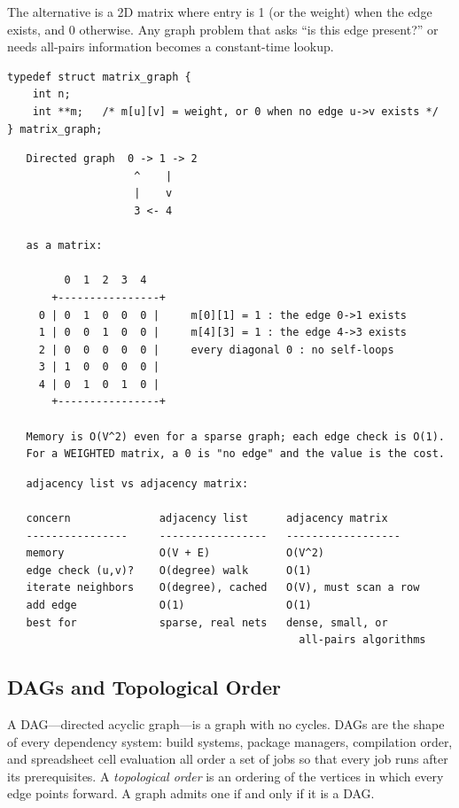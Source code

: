 The alternative is a 2D matrix where entry  is 1 (or the
weight) when the edge  exists, and 0 otherwise. Any graph
problem that asks ``is this edge present?'' or needs all-pairs
information becomes a constant-time lookup.

\begin{lstlisting}[caption={Adjacency matrix representation.}]
typedef struct matrix_graph {
    int n;
    int **m;   /* m[u][v] = weight, or 0 when no edge u->v exists */
} matrix_graph;
\end{lstlisting}

\begin{verbatim}
   Directed graph  0 -> 1 -> 2
                    ^    |
                    |    v
                    3 <- 4

   as a matrix:

         0  1  2  3  4
       +----------------+
     0 | 0  1  0  0  0 |     m[0][1] = 1 : the edge 0->1 exists
     1 | 0  0  1  0  0 |     m[4][3] = 1 : the edge 4->3 exists
     2 | 0  0  0  0  0 |     every diagonal 0 : no self-loops
     3 | 1  0  0  0  0 |
     4 | 0  1  0  1  0 |
       +----------------+

   Memory is O(V^2) even for a sparse graph; each edge check is O(1).
   For a WEIGHTED matrix, a 0 is "no edge" and the value is the cost.
\end{verbatim}

\begin{verbatim}
   adjacency list vs adjacency matrix:

   concern              adjacency list      adjacency matrix
   ----------------     -----------------   ------------------
   memory               O(V + E)            O(V^2)
   edge check (u,v)?    O(degree) walk      O(1)
   iterate neighbors    O(degree), cached   O(V), must scan a row
   add edge             O(1)                O(1)
   best for             sparse, real nets   dense, small, or
                                              all-pairs algorithms
\end{verbatim}

\subsection{DAGs and Topological Order}

A DAG---directed acyclic graph---is a graph with no cycles. DAGs are
the shape of every dependency system: build systems, package managers,
compilation order, and spreadsheet cell evaluation all order a set of
jobs so that every job runs after its prerequisites. A \emph{topological
order} is an ordering of the vertices in which every edge points
forward. A graph admits one if and only if it is a DAG.

